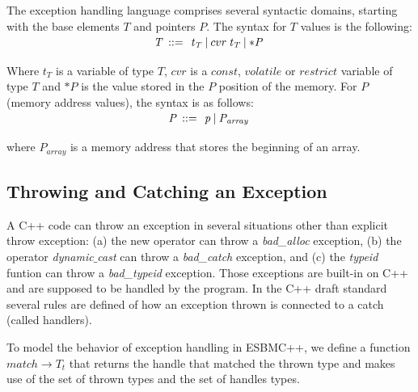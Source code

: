 \documentclass[a4paper]{llncs}
\begin{document}
{The exception handling language comprises several syntactic domains,
starting with the base elements $\mathit{T}$ and pointers $\mathit{P}$.
The syntax for $\mathit{T}$ values is the following:
%
\[\begin{array}{r@{\:\:}c@{\:\:}l}\label{element-semantics}
\\[-5ex]
\mathit{T}   & ::= & \: \mathit{t_T} \: | \: cvr \: \mathit{t_T} \: | \: \mathit{*P} \: \\
\end{array}
\]
%
Where $\mathit{t_T}$ is a variable of type $\mathit{T}$, $cvr$ is a $const$,
$volatile$ or $restrict$ variable of type $\mathit{T}$ and $\mathit{*P}$
is the value stored in the $\mathit{P}$ position of the memory.
For $\mathit{P}$ (memory address values), the syntax is as follows:
%
\[\begin{array}{r@{\:\:}c@{\:\:}l}\label{pointer-semantics}
\\[-5ex]
\mathit{P}  & ::= & \: \mathit{p} \: | \: \mathit{P_{array}} \: \\
\end{array}
\]
%
where $\mathit{P_{array}}$ is a memory address that stores the beginning
of an array.

\subsection{Throwing and Catching an Exception}

A C++ code can throw an exception in several situations other
than explicit throw exception: (a) the new operator can throw
a \textit{bad\_alloc} exception, (b) the operator
\textit{dynamic$\_$cast} can throw a \textit{bad\_catch}
exception, and (c) the \textit{typeid} funtion can throw a
\textit{bad\_typeid} exception.
Those exceptions are built-in on C++ and are supposed to be
handled by the program. In the C++ draft standard~\cite{CppDraft}
several rules are defined of how an exception
thrown is connected to a catch (called handlers).

To model the behavior of exception handling in ESBMC++, we define a function
$match \rightarrow T_t$ that returns the handle that matched the thrown type
and makes use of the set of thrown types and the set of handles types.

}
\end{document}
